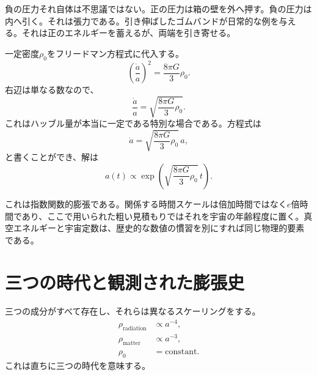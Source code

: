 負の圧力それ自体は不思議ではない。正の圧力は箱の壁を外へ押す。負の圧力は内へ引く。それは張力である。引き伸ばしたゴムバンドが日常的な例を与える。それは正のエネルギーを蓄えるが、両端を引き寄せる。

一定密度\(\rho_0\)をフリードマン方程式に代入する。
\begin{equation}
\left(\frac{\dot a}{a}\right)^2=\frac{8\pi G}{3}\rho_0.
\end{equation}
右辺は単なる数なので、
\begin{equation}
\frac{\dot a}{a}=\sqrt{\frac{8\pi G}{3}\rho_0}.
\end{equation}
これはハッブル量が本当に一定である特別な場合である。方程式は
\begin{equation}
\dot a=\sqrt{\frac{8\pi G}{3}\rho_0}\,a,
\end{equation}
と書くことができ、解は
\begin{equation}
a(t)\propto \exp\!\left(\sqrt{\frac{8\pi G}{3}\rho_0}\,t\right).
\end{equation}

これは指数関数的膨張である。関係する時間スケールは倍加時間ではなく\(e\)倍時間であり、ここで用いられた粗い見積もりではそれを宇宙の年齢程度に置く。真空エネルギーと宇宙定数は、歴史的な数値の慣習を別にすれば同じ物理的要素である。

\begin{classroomqa}
\end{classroomqa}

\begin{classroomqa}
\end{classroomqa}

\section{三つの時代と観測された膨張史}

三つの成分がすべて存在し、それらは異なるスケーリングをする。
\begin{equation}
\begin{aligned}
\rho_{\text{radiation}}&\propto a^{-4},\\
\rho_{\text{matter}}&\propto a^{-3},\\
\rho_0&=\text{constant}.
\end{aligned}
\end{equation}
これは直ちに三つの時代を意味する。

